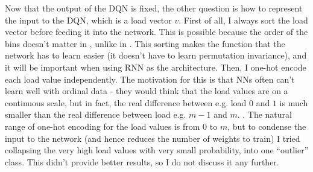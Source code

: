 Now that the output of the DQN is fixed, the other question is how to represent the input to the DQN, which is a load vector $v$. First of all, I always sort the load vector before feeding it into the network. This is possible because the order of the bins doesn't matter in \TwoThinning, unlike in \GraphicalTwoChoice{}. This sorting makes the function that the network has to learn easier (it doesn't have to learn permutation invariance), and it will be important when using RNN as the architecture. Then, I one-hot encode each load value independently. The motivation for this is that NNs often can't learn well with ordinal data - they would think that the load values are on a continuous scale, but in fact, the real difference between e.g. load $0$ and $1$ is much smaller than the real difference between load e.g. $m-1$ and $m$. . The natural range of one-hot encoding for the load values is from $0$ to $m$, but to condense the input to the network (and hence reduces the number of weights to train) I tried collapsing the very high load values with very small probability, into one ``outlier'' class. This didn't provide better results, so I do not discuss it any further.


